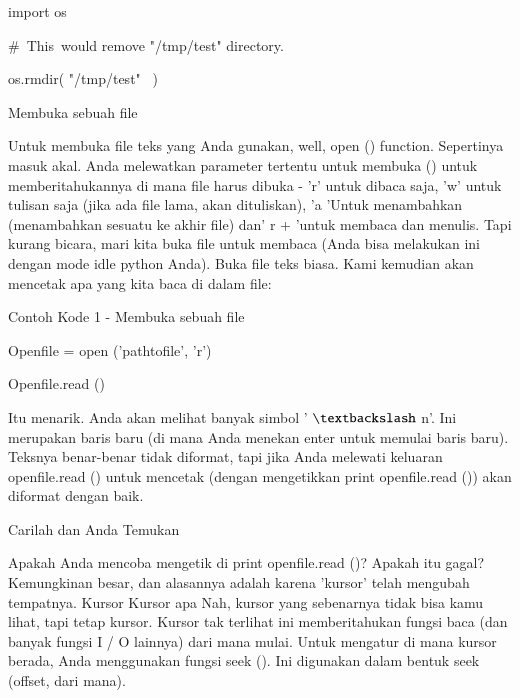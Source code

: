 \documentclass[a4paper,12pt]{report}
\begin{document}
\noindent 
import os \par
\vspace{12pt}
\noindent 
 $  \#  $~This~would  remove "/tmp/test"  directory. \par
\noindent 
os.rmdir( "/tmp/test"~ ) \par
\vspace{14pt}
\vspace{14pt}
\noindent 
Membuka sebuah file \par
\noindent 
\vspace{12pt}
\noindent 
Untuk membuka file teks yang Anda gunakan, well, open () function. Sepertinya masuk akal. Anda melewatkan parameter tertentu untuk membuka () untuk memberitahukannya di mana file harus dibuka - 'r' untuk dibaca saja, 'w' untuk tulisan saja (jika ada file lama, akan dituliskan), 'a 'Untuk menambahkan (menambahkan sesuatu ke akhir file) dan' r + 'untuk membaca dan menulis. Tapi kurang bicara, mari kita buka file untuk membaca (Anda bisa melakukan ini dengan mode idle python Anda). Buka file teks biasa. Kami kemudian akan mencetak apa yang kita baca di dalam file: \par
\noindent 
Contoh Kode 1 - Membuka sebuah file \par
\noindent 
\vspace{12pt}
\noindent 
Openfile = open ('pathtofile', 'r') \par
\noindent 
Openfile.read () \par
\noindent 
\vspace{12pt}
\noindent 
Itu menarik. Anda akan melihat banyak simbol ' $  \textbackslash  $ n'. Ini merupakan baris baru (di mana Anda menekan enter untuk memulai baris baru). Teksnya benar-benar tidak diformat, tapi jika Anda melewati keluaran openfile.read () untuk mencetak (dengan mengetikkan print openfile.read ()) akan diformat dengan baik. \par
\noindent 
Carilah dan Anda Temukan \par
\noindent 
\vspace{12pt}
\noindent 
Apakah Anda mencoba mengetik di print openfile.read ()? Apakah itu gagal? Kemungkinan besar, dan alasannya adalah karena 'kursor' telah mengubah tempatnya. Kursor Kursor apa Nah, kursor yang sebenarnya tidak bisa kamu lihat, tapi tetap kursor. Kursor tak terlihat ini memberitahukan fungsi baca (dan banyak fungsi I / O lainnya) dari mana mulai. Untuk mengatur di mana kursor berada, Anda menggunakan fungsi seek (). Ini digunakan dalam bentuk seek (offset, dari mana). \par
\end{document}
